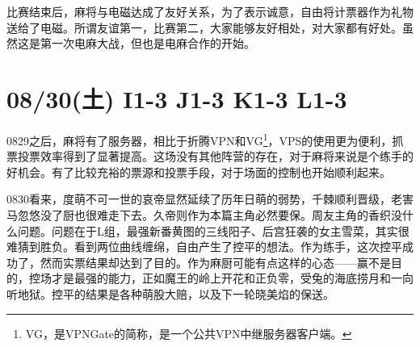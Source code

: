 比赛结束后，麻将与电磁达成了友好关系，为了表示诚意，自由将计票器作为礼物送给了电磁。所谓友谊第一，比赛第二，大家能够友好相处，对大家都有好处。虽然这是第一次电麻大战，但也是电麻合作的开始。

\section{08/30(土) I1-3 J1-3 K1-3 L1-3}


0829之后，麻将有了服务器，相比于折腾VPN和VG\footnote{VG，是VPNGate的简称，是一个公共VPN中继服务器客户端。}，VPS的使用更为便利，抓票投票效率得到了显著提高。这场没有其他阵营的存在，对于麻将来说是个练手的好机会。有了比较充裕的票源和投票手段，对于场面的控制也开始顺利起来。

0830看来，度萌不可一世的哀帝显然延续了历年日萌的弱势，千棘顺利晋级，老害马忽悠没了厨也很难走下去。久帝则作为本篇主角必然要保。周友主角的香织没什么问题。问题在于L组，最强新番黄图的三线阳子、后宫狂袭的女主雪菜，其实很难猜到胜负。看到两位曲线缠绵，自由产生了控平的想法。作为练手，这次控平成功了，然而实票结果却达到了目的。作为麻厨可能有点这样的心态——赢不是目的，控场才是最强的能力，正如魔王的岭上开花和正负零，受兔的海底捞月和一向听地狱。控平的结果是各种萌股大赔，以及下一轮晓美焰的保送。

